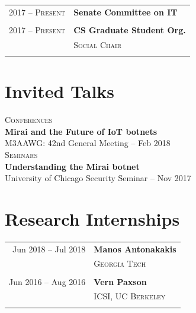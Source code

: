 \documentclass[10pt]{article} %
\begin{document}
{\begin{minipage}[t]{0.44\textwidth}
\begin{tabular}{rl}
2017 -- \textsc{Present} & \textbf{Senate Committee on IT} \\
& \\

2017 -- \textsc{Present} & \textbf{CS Graduate Student Org.}\\
& \textsc{Social Chair} \\
& \\

\end{tabular}


\section{Invited Talks} 

\textsc{Conferences}\\
\hspace*{15pt} \textbf{Mirai and the Future of IoT botnets}\\
\hspace*{15pt} M3AAWG: 42nd General Meeting -- Feb 2018 \\

\textsc{Seminars}\\
\hspace*{15pt} \textbf{Understanding the Mirai botnet} \\
\hspace*{15pt} University of Chicago Security Seminar -- Nov 2017 \\


\section{Research Internships} 

\begin{tabular}{rl}
Jun 2018 -- Jul 2018 & \textbf{Manos Antonakakis}\\
& \textsc{Georgia Tech}\\
&\\

Jun 2016 -- Aug 2016 & \textbf{Vern Paxson}\\
& \textsc{ICSI, UC Berkeley}\\
& \\


\end{tabular}
\end{minipage}}
\end{document}
